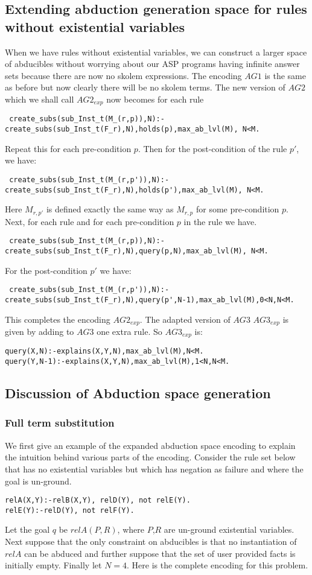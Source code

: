 \documentclass{article}
\begin{document}
\subsection{Extending abduction generation space for rules without existential variables}
When we have rules without existential variables, we can construct a larger space of abducibles without worrying about our ASP programs having infinite answer sets because there are now no skolem expressions. The encoding $AG1$ is the same as before but now clearly there will be no skolem terms. The new version of $AG2$ which we shall call $AG2_{exp}$ now becomes for each rule
\begin{verbatim}
 create_subs(sub_Inst_t(M_(r,p)),N):-create_subs(sub_Inst_t(F_r),N),holds(p),max_ab_lvl(M), N<M.   
\end{verbatim}
Repeat this for each pre-condition $p$. Then for the post-condition of the rule $p'$, we have:
\begin{verbatim}
 create_subs(sub_Inst_t(M_(r,p')),N):-create_subs(sub_Inst_t(F_r),N),holds(p'),max_ab_lvl(M), N<M.   
\end{verbatim}
Here $M_{r,p'}$ is defined exactly the same way as $M_{r,p}$ for some pre-condition $p$. Next, for each rule and for each pre-condition $p$ in the rule we have.
\begin{verbatim}
 create_subs(sub_Inst_t(M_(r,p)),N):-create_subs(sub_Inst_t(F_r),N),query(p,N),max_ab_lvl(M), N<M.   
\end{verbatim}
For the post-condition $p'$ we have:
\begin{verbatim}
 create_subs(sub_Inst_t(M_(r,p')),N):-create_subs(sub_Inst_t(F_r),N),query(p',N-1),max_ab_lvl(M),0<N,N<M.   
\end{verbatim}
This completes the encoding $AG2_{exp}$. The adapted version of $AG3$ $AG3_{exp}$ is given by adding to $AG3$ one extra rule. So $AG3_{exp}$ is:
\begin{verbatim}
query(X,N):-explains(X,Y,N),max_ab_lvl(M),N<M.
query(Y,N-1):-explains(X,Y,N),max_ab_lvl(M),1<N,N<M.
\end{verbatim}
\subsection{Discussion of Abduction space generation}
\subsubsection{Full term substitution}
We first give an example of the expanded abduction space encoding to explain the intuition behind various parts of the encoding. Consider the rule set below that has no existential variables but which has negation as failure and where the goal is un-ground. 
\begin{verbatim}
relA(X,Y):-relB(X,Y), relD(Y), not relE(Y).
relE(Y):-relD(Y), not relF(Y).
\end{verbatim}
Let the goal $q$ be $relA(P,R)$, where $P$,$R$ are un-ground existential variables. Next suppose that the only constraint on abducibles is that no instantiation of $relA$ can be abduced and further suppose that the set of user provided facts is initially empty. Finally let $N=4$. Here is the complete encoding for this problem. 
\end{document}
